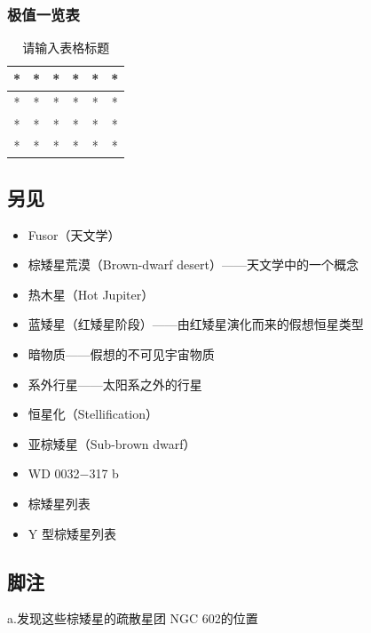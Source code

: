 \subsubsection{极值一览表}
\begin{table}[ht]
\centering
\caption{请输入表格标题}\label{tab_Brdw2}
\begin{tabular}{|c|c|c|c|c|c|}
\hline
* & * & * & * & * & * \\
\hline
* & * & * & * & * & * \\
\hline
* & * & * & * & * & * \\
\hline
* & * & * & * & * & * \\
\hline
\end{tabular}
\end{table}
\subsection{另见}
\begin{itemize}
\item Fusor（天文学）
\item 棕矮星荒漠（Brown-dwarf desert）——天文学中的一个概念
\item 热木星（Hot Jupiter）
\item 蓝矮星（红矮星阶段）——由红矮星演化而来的假想恒星类型
\item 暗物质——假想的不可见宇宙物质
\item 系外行星——太阳系之外的行星
\item 恒星化（Stellification）
\item 亚棕矮星（Sub-brown dwarf）
\item WD 0032−317 b
\item 棕矮星列表
\item Y 型棕矮星列表
\end{itemize}
\subsection{脚注}
a.发现这些棕矮星的疏散星团 NGC 602的位置
